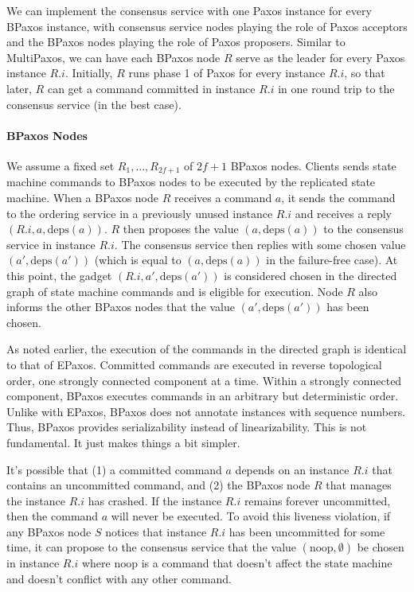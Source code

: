 \documentclass{mwhittaker}
\theoremstyle{definition}
\newcommand{\deps}[1]{\text{deps}(#1)}
\begin{document}
We can implement the consensus service with one Paxos instance for every BPaxos
instance, with consensus service nodes playing the role of Paxos acceptors and
the BPaxos nodes playing the role of Paxos proposers. Similar to MultiPaxos, we
can have each BPaxos node $R$ serve as the leader for every Paxos instance
$R.i$. Initially, $R$ runs phase 1 of Paxos for every instance $R.i$, so that
later, $R$ can get a command committed in instance $R.i$ in one round trip to
the consensus service (in the best case).

\paragraph{BPaxos Nodes}
We assume a fixed set $R_1, \ldots, R_{2f+1}$ of $2f + 1$ BPaxos nodes.
%
Clients sends state machine commands to BPaxos nodes to be executed by the
replicated state machine. When a BPaxos node $R$ receives a command $a$, it
sends the command to the ordering service in a previously unused instance $R.i$
and receives a reply $(R.i, a, \deps{a})$. $R$ then proposes the value $(a,
\deps{a})$ to the consensus service in instance $R.i$. The consensus service
then replies with some chosen value $(a', \deps{a'})$ (which is equal to $(a,
\deps{a})$ in the failure-free case). At this point, the gadget $(R.i, a',
\deps{a'})$ is considered chosen in the directed graph of state machine
commands and is eligible for execution. Node $R$ also informs the other BPaxos
nodes that the value $(a', \deps{a'})$ has been chosen.

As noted earlier, the execution of the commands in the directed graph is
identical to that of EPaxos. Committed commands are executed in reverse
topological order, one strongly connected component at a time. Within a
strongly connected component, BPaxos executes commands in an arbitrary but
deterministic order. Unlike with EPaxos, BPaxos does not annotate instances
with sequence numbers. Thus, BPaxos provides serializability instead of
linearizability. This is not fundamental. It just makes things a bit simpler.

\newcommand{\noop}{\text{noop}}
It's possible that (1) a committed command $a$ depends on an instance $R.i$
that contains an uncommitted command, and (2) the BPaxos node $R$ that manages
the instance $R.i$ has crashed. If the instance $R.i$ remains forever
uncommitted, then the command $a$ will never be executed. To avoid this
liveness violation, if any BPaxos node $S$ notices that instance $R.i$ has been
uncommitted for some time, it can propose to the consensus service that the
value $(\noop, \emptyset)$ be chosen in instance $R.i$ where $\noop$ is a
command that doesn't affect the state machine and doesn't conflict with any
other command.
\end{document}
